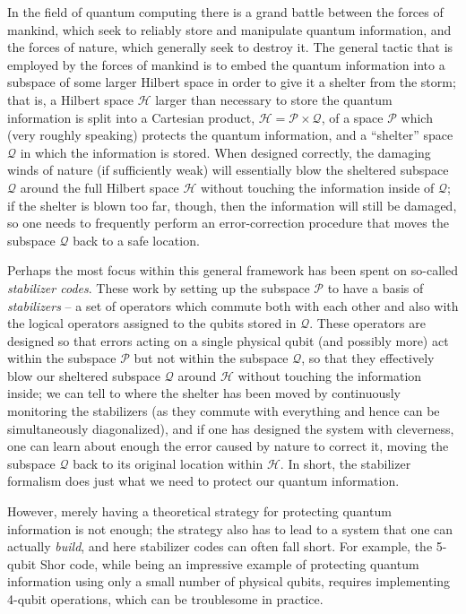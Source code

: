 \documentclass[aps,pra,amsfonts,amsmath,amssymb]{revtex4}
\begin{document}
In the field of quantum computing there is a grand battle between the forces of mankind, which seek to reliably store and manipulate quantum information, and the forces of nature, which generally seek to destroy it.  The general tactic that is employed by the forces of mankind is to embed the quantum information into a subspace of some larger Hilbert space in order to give it a shelter from the storm;  that is, a Hilbert space $\mathscr{H}$ larger than necessary to store the quantum information is split into a Cartesian product, $\mathscr{H}=\mathscr{P}\times\mathscr{Q}$, of a space $\mathscr{P}$ which (very roughly speaking) protects the quantum information, and a ``shelter'' space $\mathscr{Q}$ in which the information is stored.  When designed correctly, the damaging winds of nature (if sufficiently weak) will essentially blow the sheltered subspace $\mathscr{Q}$ around the full Hilbert space $\mathscr{H}$ without touching the information inside of $\mathscr{Q}$;  if the shelter is blown too far, though, then the information will still be damaged, so one needs to frequently perform an error-correction procedure that moves the subspace $\mathscr{Q}$ back to a safe location.

Perhaps the most focus within this general framework has been spent on so-called \emph{stabilizer codes}.  These work by setting up the subspace $\mathscr{P}$ to have a basis of \emph{stabilizers} -- a set of operators which commute both with each other and also with the logical operators assigned to the qubits stored in $\mathscr{Q}$.  These operators are designed so that errors acting on a single physical qubit (and possibly more) act within the subspace $\mathscr{P}$ but not within the subspace $\mathscr{Q}$, so that they effectively blow our sheltered subspace $\mathscr{Q}$ around $\mathscr{H}$ without touching the information inside;  we can tell to where the shelter has been moved by continuously monitoring the stabilizers (as they commute with everything and hence can be simultaneously diagonalized), and if one has designed the system with cleverness, one can learn about enough the error caused by nature to correct it, moving the subspace $\mathscr{Q}$ back to its original location within $\mathscr{H}$.  In short, the stabilizer formalism does  just what we need to protect our quantum information.

However, merely having a theoretical strategy for protecting quantum information is not enough;  the strategy also has to lead to a system that one can actually \emph{build}, and here stabilizer codes can often fall short.  For example, the 5-qubit Shor code, while being an impressive example of protecting quantum information using only a small number of physical qubits, requires implementing 4-qubit operations, which can be troublesome in practice.
\end{document}

